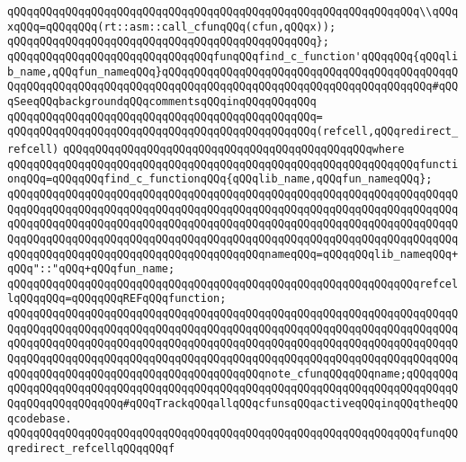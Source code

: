 \verb|qQQqqQQqqQQqqQQqqQQqqQQqqQQqqQQqqQQqqQQqqQQqqQQqqQQqqQQqqQQqqQQq\\qQQqxqQQq=qQQqqQQq(rt::asm::call_cfunqQQq(cfun,qQQqx));|\newline
\verb|qQQqqQQqqQQqqQQqqQQqqQQqqQQqqQQqqQQqqQQqqQQqqQQq};|\newline
\newline
\verb|qQQqqQQqqQQqqQQqqQQqqQQqqQQqqQQqfunqQQqfind_c_function'qQQqqQQq{qQQqlib_name,qQQqfun_nameqQQq}qQQqqQQqqQQqqQQqqQQqqQQqqQQqqQQqqQQqqQQqqQQqqQQqqQQqqQQqqQQqqQQqqQQqqQQqqQQqqQQqqQQqqQQqqQQqqQQqqQQqqQQqqQQqqQQq#qQQqSeeqQQqbackgroundqQQqcommentsqQQqinqQQqqQQqqQQq|\newline
\verb|qQQqqQQqqQQqqQQqqQQqqQQqqQQqqQQqqQQqqQQqqQQqqQQq=|\newline
\verb|qQQqqQQqqQQqqQQqqQQqqQQqqQQqqQQqqQQqqQQqqQQqqQQq(refcell,qQQqredirect_refcell)|\newline
\verb|qQQqqQQqqQQqqQQqqQQqqQQqqQQqqQQqqQQqqQQqqQQqqQQqwhere|\newline
\verb|qQQqqQQqqQQqqQQqqQQqqQQqqQQqqQQqqQQqqQQqqQQqqQQqqQQqqQQqqQQqqQQqfunctionqQQq=qQQqqQQqfind_c_functionqQQq{qQQqlib_name,qQQqfun_nameqQQq};|\newline
\verb|qQQqqQQqqQQqqQQqqQQqqQQqqQQqqQQqqQQqqQQqqQQqqQQqqQQqqQQqqQQqqQQqqQQqqQQqqQQqqQQqqQQqqQQqqQQqqQQqqQQqqQQqqQQqqQQqqQQqqQQqqQQqqQQqqQQqqQQqqQQqqQQqqQQqqQQqqQQqqQQqqQQqqQQqqQQqqQQqqQQqqQQqqQQqqQQqqQQqqQQqqQQqqQQqqQQqqQQqqQQqqQQqqQQqqQQqqQQqqQQqqQQqqQQqqQQqqQQqqQQqqQQqqQQqqQQqqQQqqQQqqQQqqQQqqQQqqQQqqQQqqQQqqQQqqQQqqQQqqQQqnameqQQq=qQQqqQQqlib_nameqQQq+qQQq"::"qQQq+qQQqfun_name;|\newline
\verb|qQQqqQQqqQQqqQQqqQQqqQQqqQQqqQQqqQQqqQQqqQQqqQQqqQQqqQQqqQQqqQQqrefcellqQQqqQQq=qQQqqQQqREFqQQqfunction;|\newline
\verb|qQQqqQQqqQQqqQQqqQQqqQQqqQQqqQQqqQQqqQQqqQQqqQQqqQQqqQQqqQQqqQQqqQQqqQQqqQQqqQQqqQQqqQQqqQQqqQQqqQQqqQQqqQQqqQQqqQQqqQQqqQQqqQQqqQQqqQQqqQQqqQQqqQQqqQQqqQQqqQQqqQQqqQQqqQQqqQQqqQQqqQQqqQQqqQQqqQQqqQQqqQQqqQQqqQQqqQQqqQQqqQQqqQQqqQQqqQQqqQQqqQQqqQQqqQQqqQQqqQQqqQQqqQQqqQQqqQQqqQQqqQQqqQQqqQQqqQQqqQQqqQQqqQQqqQQqqQQqqQQqnote_cfunqQQqqQQqname;qQQqqQQqqQQqqQQqqQQqqQQqqQQqqQQqqQQqqQQqqQQqqQQqqQQqqQQqqQQqqQQqqQQqqQQqqQQqqQQqqQQqqQQqqQQqqQQq#qQQqTrackqQQqallqQQqcfunsqQQqactiveqQQqinqQQqtheqQQqcodebase.|\newline
\verb|qQQqqQQqqQQqqQQqqQQqqQQqqQQqqQQqqQQqqQQqqQQqqQQqqQQqqQQqqQQqqQQqfunqQQqredirect_refcellqQQqqQQqf|\newline
